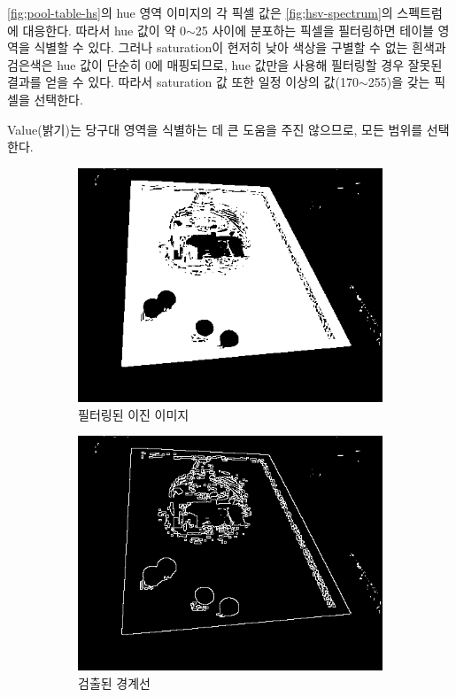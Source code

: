 \documentclass[10pt]{oblivoir}
\begin{document}
\cref{fig;pool-table-hs}의 hue 영역 이미지의 각 픽셀 값은 \cref{fig;hsv-spectrum}의 스펙트럼에 대응한다. 따라서 hue 값이 약 0$\sim$25 사이에 분포하는 픽셀을 필터링하면 테이블 영역을 식별할 수 있다. 그러나 saturation이 현저히 낮아 색상을 구별할 수 없는 흰색과 검은색은 hue 값이 단순히 0에 매핑되므로, hue 값만을 사용해 필터링할 경우 잘못된 결과를 얻을 수 있다. 따라서 saturation 값 또한 일정 이상의 값(170$\sim$255)을 갖는 픽셀을 선택한다.

Value(밝기)는 당구대 영역을 식별하는 데 큰 도움을 주진 않으므로, 모든 범위를 선택한다.

\begin{figure}[ht]
    \centering
    \begin{subfigure}{0.4\textwidth}
        \includegraphics[width=\textwidth]{img/billiards-table-filter.png}
        \caption{필터링된 이진 이미지}
        \label{fig;pool-table-edge-a}
    \end{subfigure}
    \begin{subfigure}{0.4\textwidth}
        \includegraphics[width=\textwidth]{img/billiards-table-edge.png}
        \caption{검출된 경계선}
        \label{fig;pool-table-edge-b}
    \end{subfigure}
    \caption{}
    \label{fig;pool-table-edge}
\end{figure}
\end{document}
